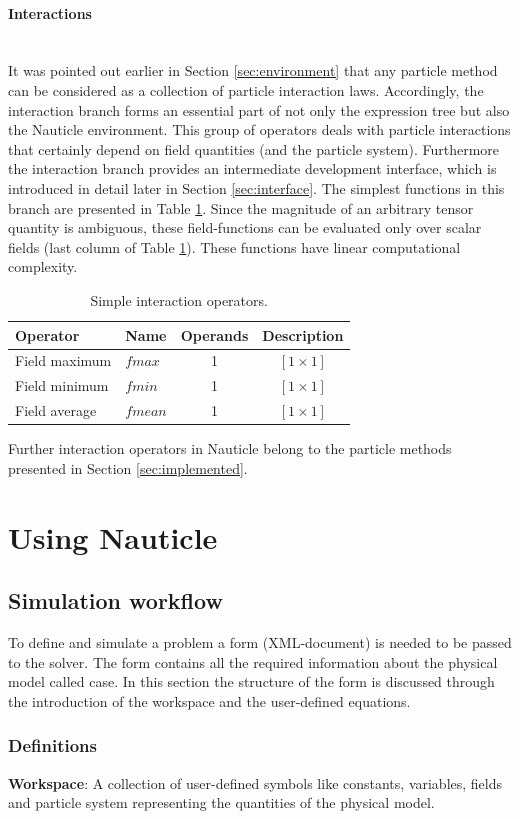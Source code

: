 \documentclass[a4paper,12pt,openany]{book}
\newcommand{\myparagraph}[1]{\paragraph{#1}\mbox{}\\}
\theoremstyle{break}
\begin{document}
\myparagraph{Interactions}
It was pointed out earlier in Section \ref{sec:environment} that any particle method can be considered as a collection of particle interaction laws. Accordingly, the interaction branch forms an essential part of not only the expression tree but also the Nauticle environment. This group of operators deals with particle interactions that certainly depend on field quantities (and the particle system). Furthermore the interaction branch provides an intermediate development interface, which is introduced in detail later in Section \ref{sec:interface}.
The simplest functions in this branch are presented in Table \ref{tbl:fsearch}. Since the magnitude of an arbitrary tensor quantity is ambiguous, these field-functions can be evaluated only over scalar fields (last column of Table \ref{tbl:fsearch}). These functions have linear computational complexity.
\begin{table}
\begin{center}
\caption{Simple interaction operators.}\label{tbl:fsearch}
\begin{tabular}{ l l c c }
\toprule[1.5pt]
\bf Operator & \bf Name & \bf Operands & \bf Description\\
\midrule
Field maximum & $fmax$ & 1 & $[1 \times 1]$\\ 
Field minimum & $fmin$ & 1 & $[1 \times 1]$\\ 
Field average & $fmean$ & 1 & $[1 \times 1]$\\
\bottomrule[1.25pt]
\end{tabular}
\end{center}
\end{table}
Further interaction operators in Nauticle belong to the particle methods presented in Section \ref{sec:implemented}.

\section{Using Nauticle}
\subsection{Simulation workflow} \label{sec:sim_workflow}
To define and simulate a problem a form (XML-document) is needed to be passed to the solver. The form contains all the required information about the physical model called case. In this section the structure of the form is discussed through the introduction of the workspace and the user-defined equations.
\subsubsection{Definitions}
\textbf{Workspace}: A collection of user-defined symbols like constants, variables, fields and particle system representing the quantities of the physical model.
\end{document}
